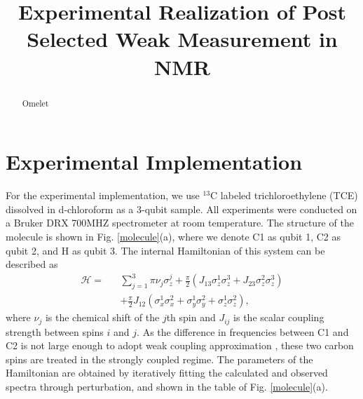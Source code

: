 \documentclass[prl,twocolumn,showpacs]{revtex4}
\begin{document}
\title{Experimental Realization of Post Selected Weak Measurement in NMR}

\begin{abstract}
Omelet
\end{abstract}

\maketitle


\section{Experimental Implementation}
For the experimental implementation, we use $^{13}$C labeled trichloroethylene (TCE) dissolved in d-chloroform as a 3-qubit sample. All experiments were conducted on a Bruker DRX 700MHZ spectrometer at room temperature. The structure of the molecule is shown in Fig. \ref{molecule}(a), where we denote C1 as qubit 1, C2 as qubit 2, and H as qubit 3. The internal Hamiltonian of this system can be described as
\begin{eqnarray}\label{Hamiltonian}
\mathcal{H}=&&\sum\limits_{j=1}^3 {\pi \nu _j } \sigma _z^j  + \frac{\pi}{2}(J_{13}\sigma _z^1 \sigma _z^3+J_{23}\sigma _z^2 \sigma _z^3) \nonumber\\
&&+ \frac{\pi}{2}J_{12} (\sigma _x^1 \sigma _x^2+\sigma _y^1 \sigma _y^2+\sigma _z^1 \sigma _z^2),
\end{eqnarray}
where $\nu_j$ is the chemical shift of the $j$th spin and $J_{ij}$ is the scalar coupling strength between spins $i$ and $j$. As the difference in frequencies between C1 and C2 is not large enough to adopt weak coupling approximation \cite{nmrreview}, these two carbon spins are treated in the strongly coupled regime. The parameters of the Hamiltonian are obtained by iteratively fitting the calculated and observed spectra through perturbation, and shown in the table of Fig. \ref{molecule}(a).
\end{document}
